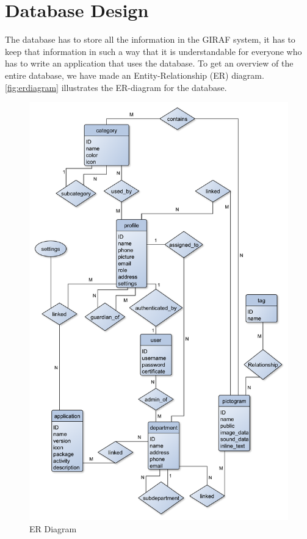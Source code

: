 \section{Database Design}
The database has to store all the information in the GIRAF system, it has to keep that information in such a way that it is understandable for everyone who has to write an application that uses the database.
To get an overview of the entire database, we have made an Entity-Relationship (ER) diagram. \autoref{fig:erdiagram} illustrates the ER-diagram for the database.

\begin{figure}[hptb]
\begin{center}
\includegraphics[width=\textwidth]{img/ER_diagram3.pdf}
\caption{ER Diagram}
\label{fig:erdiagram}
\end{center}
\end{figure}


